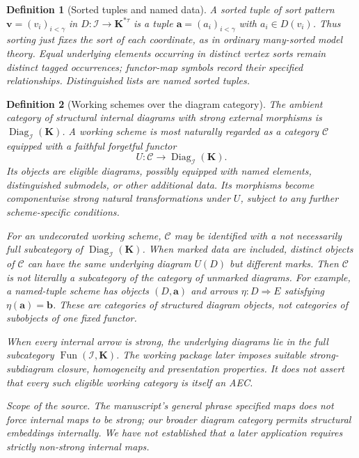 \documentclass[11pt]{article}
\newcommand{\K}{\mathbf K}
\newcommand{\ba}{\mathbf{a}}
\newcommand{\bb}{\mathbf{b}}
\theoremstyle{plain}
\newtheorem{definition}{Definition}[section]
\begin{document}
\begin{definition}[Sorted tuples and named data]
A sorted tuple of sort pattern
$\mathbf v=(v_i)_{i<\gamma}$ in
$D:\mathcal I\to\K^{*\tau}$ is a tuple
$\ba=(a_i)_{i<\gamma}$ with
$a_i\in D(v_i)$. Thus sorting just
fixes the sort of each coordinate,
as in ordinary many-sorted model theory.
Equal underlying elements occurring in
distinct vertex sorts remain distinct
tagged occurrences; functor-map symbols
record their specified relationships.
Distinguished lists are named sorted tuples.
\end{definition}

\begin{definition}[Working schemes over the diagram category]
\label{def:designated-arrows}
The ambient category of \emph{structural
internal diagrams with strong external
morphisms} is
$\operatorname{Diag}_{\mathcal I}(\K)$.
A working scheme is most naturally
regarded as a category $\mathcal C$
equipped with a \emph{faithful forgetful
functor}
\[
U:\mathcal C\longrightarrow
\operatorname{Diag}_{\mathcal I}(\K).
\]
Its objects are eligible diagrams,
possibly equipped with \emph{named
elements, distinguished submodels,
or other additional data}.
Its morphisms become componentwise
strong natural transformations under
$U$, subject to any further
scheme-specific conditions.

For an \emph{undecorated} working
scheme, $\mathcal C$ may be identified
with a not necessarily full subcategory
of $\operatorname{Diag}_{\mathcal I}(\K)$.
When marked data are included, distinct
objects of $\mathcal C$ can have the
same underlying diagram $U(D)$ but
different marks. Then $\mathcal C$
is \emph{not literally} a subcategory
of the category of unmarked diagrams.
For example, a named-tuple scheme
has objects $(D,\ba)$ and arrows
$\eta:D\Rightarrow E$ satisfying
$\eta(\ba)=\bb$.
These are categories of structured
\emph{diagram objects}, not categories
of subobjects of one fixed functor.

When every internal arrow is strong,
the underlying diagrams lie in the
full subcategory
$\operatorname{Fun}(\mathcal I,\K)$.
The working package later imposes
suitable strong-subdiagram closure,
homogeneity and presentation
properties. It does not assert that
every such eligible working category
is itself an AEC.

\emph{Scope of the source.} The manuscript's
general phrase \emph{specified maps} does
not force internal maps to be strong;
our broader diagram category permits
structural embeddings internally.
We have not established that a later
application requires strictly non-strong
internal maps.
\end{definition}
\end{document}
